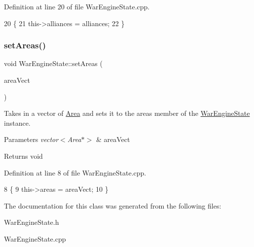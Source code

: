 Definition at line 20 of file War\+Engine\+State.\+cpp.


\begin{DoxyCode}
20                                                              \{
21     this->alliances = alliances;
22 \}
\end{DoxyCode}
\mbox{\label{classWarEngineState_a5cb156803af207c0498a8e1d33972cd8}} 
\subsubsection{\texorpdfstring{set\+Areas()}{setAreas()}}
{\footnotesize\ttfamily void War\+Engine\+State\+::set\+Areas (\begin{DoxyParamCaption}\item[{vector$<$ \hyperlink{classArea}{Area} $\ast$$>$}]{area\+Vect }\end{DoxyParamCaption})}



Takes in a vector of \hyperlink{classArea}{Area} and sets it to the areas member of the \hyperlink{classWarEngineState}{War\+Engine\+State} instance. 


\begin{DoxyParams}{Parameters}
{\em vector$<$\+Area$\ast$$>$} & area\+Vect \\
\hline
\end{DoxyParams}
\begin{DoxyReturn}{Returns}
void 
\end{DoxyReturn}


Definition at line 8 of file War\+Engine\+State.\+cpp.


\begin{DoxyCode}
8                                                     \{
9     this->areas = areaVect;
10 \}
\end{DoxyCode}


The documentation for this class was generated from the following files\+:\begin{DoxyCompactItemize}
\item 
War\+Engine\+State.\+h\item 
War\+Engine\+State.\+cpp\end{DoxyCompactItemize}
